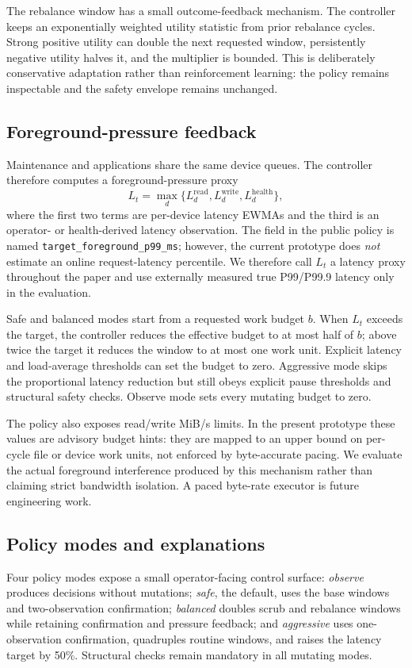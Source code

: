 The rebalance window has a small outcome-feedback mechanism. The controller keeps an exponentially weighted utility statistic from prior rebalance cycles. Strong positive utility can double the next requested window, persistently negative utility halves it, and the multiplier is bounded. This is deliberately conservative adaptation rather than reinforcement learning: the policy remains inspectable and the safety envelope remains unchanged.

\subsection{Foreground-pressure feedback}
\label{sec:foreground-feedback}
Maintenance and applications share the same device queues. The controller therefore computes a foreground-pressure proxy
\begin{equation}
  L_t = \max_d \{L^{\mathrm{read}}_d,L^{\mathrm{write}}_d,L^{\mathrm{health}}_d\},
  \label{eq:latency-proxy}
\end{equation}
where the first two terms are per-device latency EWMAs and the third is an operator- or health-derived latency observation. The field in the public policy is named \texttt{target\_foreground\_p99\_ms}; however, the current prototype does \emph{not} estimate an online request-latency percentile. We therefore call $L_t$ a latency proxy throughout the paper and use externally measured true P99/P99.9 latency only in the evaluation.

Safe and balanced modes start from a requested work budget $b$. When $L_t$ exceeds the target, the controller reduces the effective budget to at most half of $b$; above twice the target it reduces the window to at most one work unit. Explicit latency and load-average thresholds can set the budget to zero. Aggressive mode skips the proportional latency reduction but still obeys explicit pause thresholds and structural safety checks. Observe mode sets every mutating budget to zero.

The policy also exposes read/write MiB/s limits. In the present prototype these values are advisory budget hints: they are mapped to an upper bound on per-cycle file or device work units, not enforced by byte-accurate pacing. We evaluate the actual foreground interference produced by this mechanism rather than claiming strict bandwidth isolation. A paced byte-rate executor is future engineering work.

\subsection{Policy modes and explanations}
\label{sec:policy-modes}
Four policy modes expose a small operator-facing control surface: \emph{observe} produces decisions without mutations; \emph{safe}, the default, uses the base windows and two-observation confirmation; \emph{balanced} doubles scrub and rebalance windows while retaining confirmation and pressure feedback; and \emph{aggressive} uses one-observation confirmation, quadruples routine windows, and raises the latency target by 50\%. Structural checks remain mandatory in all mutating modes.

